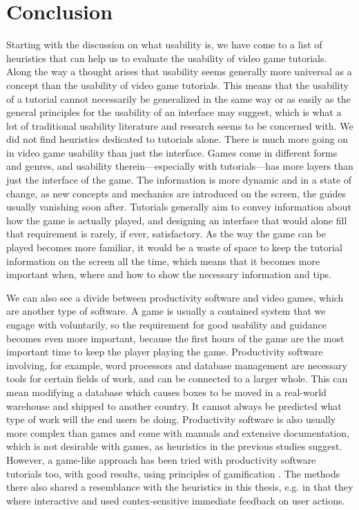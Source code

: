 \chapter{Conclusion}
Starting with the discussion on what usability is, we have come to a list of heuristics that can help us to evaluate the usability of video game tutorials. Along the way a thought arises that usability seems generally more universal as a concept than the usability of video game tutorials. This means that the usability of a tutorial cannot necessarily be generalized in the same way or as easily as the general principles for the usability of an interface may suggest, which is what a lot of traditional usability literature and research seems to be concerned with. We did not find heuristics dedicated to tutorials alone. There is much more going on in video game usability than just the interface. Games come in different forms and genres, and usability therein---especially with tutorials---has more layers than just the interface of the game. The information is more dynamic and in a state of change, as new concepts and mechanics are introduced on the screen, the guides usually vanishing soon after. Tutorials generally aim to convey information about how the game is actually played, and designing an interface that would alone fill that requirement is rarely, if ever, satisfactory. As the way the game can be played becomes more familiar, it would be a waste of space to keep the tutorial information on the screen all the time, which means that it becomes more important when, where and how to show the necessary information and tips. 

We can also see a divide between productivity software and video games, which are another type of software. A game is usually a contained system that we engage with voluntarily, so the requirement for good usability and guidance becomes even more important, because the first hours of the game are the most important time to keep the player playing the game. Productivity software involving, for example, word processors and database management are necessary tools for certain fields of work, and can be connected to a larger whole. This can mean modifying a database which causes boxes to be moved in a real-world warehouse and shipped to another country. It cannot always be predicted what type of work will the end users be doing. Productivity software is also usually more complex than games and come with manuals and extensive documentation, which is not desirable with games, as heuristics in the previous studies suggest. However, a game-like approach has been tried with productivity software tutorials too, with good results, using principles of gamification \cite{Li2012}. The methods there also shared a resemblance with the heuristics in this thesis, e.g. in that they where interactive and used contex-sensitive immediate feedback on user actions. 

